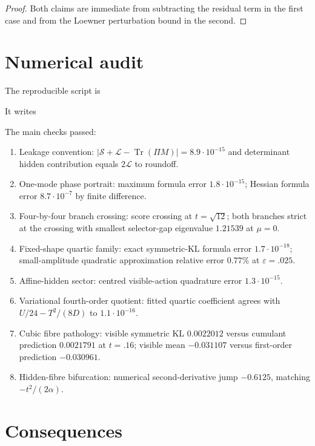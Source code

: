 \documentclass[11pt,a4paper]{article}
\numberwithin{equation}{section}
\DeclareMathOperator{\Tr}{Tr}
\theoremstyle{thmcompact}
\theoremstyle{remark}
\begin{document}
\begin{proof}
Both claims are immediate from subtracting the residual term in the first case and from the Loewner perturbation bound in the second.
\end{proof}

\section{Numerical audit}

The reproducible script is
\begin{center}
\end{center}
It writes
\begin{center}
\end{center}

The main checks passed:
\begin{enumerate}
\item Leakage convention: $|\mathcal S+\mathcal L-\Tr(\Pi M)|=8.9\cdot10^{-15}$ and determinant hidden contribution equals $2\mathcal L$ to roundoff.
\item One-mode phase portrait: maximum formula error $1.8\cdot10^{-15}$; Hessian formula error $8.7\cdot10^{-7}$ by finite difference.
\item Four-by-four branch crossing: score crossing at $t=\sqrt{12}$; both branches strict at the crossing with smallest selector-gap eigenvalue $1.21539$ at $\mu=0$.
\item Fixed-shape quartic family: exact symmetric-KL formula error $1.7\cdot10^{-18}$; small-amplitude quadratic approximation relative error $0.77\%$ at $\varepsilon=.025$.
\item Affine-hidden sector: centred visible-action quadrature error $1.3\cdot10^{-15}$.
\item Variational fourth-order quotient: fitted quartic coefficient agrees with $U/24-T^2/(8D)$ to $1.1\cdot10^{-16}$.
\item Cubic fibre pathology: visible symmetric KL $0.0022012$ versus cumulant prediction $0.0021791$ at $t=.16$; visible mean $-0.031107$ versus first-order prediction $-0.030961$.
\item Hidden-fibre bifurcation: numerical second-derivative jump $-0.6125$, matching $-t^2/(2\alpha)$.
\end{enumerate}

\section{Consequences}
\end{document}
